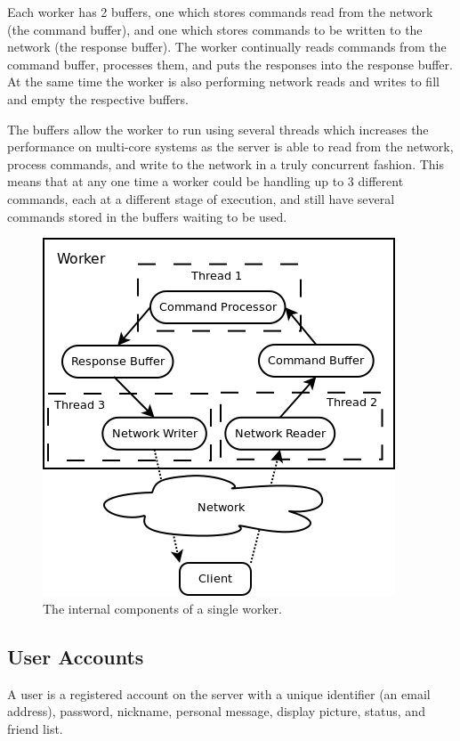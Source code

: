 Each worker has 2 buffers, one which stores commands read from the network (the command buffer), and one which stores commands to be written to the network (the response buffer). The worker continually reads commands from the command buffer, processes them, and puts the responses into the response buffer. At the same time the worker is also performing network reads and writes to fill and empty the respective buffers.

The buffers allow the worker to run using several threads which increases the performance on multi-core systems as the server is able to read from the network, process commands, and write to the network in a truly concurrent fashion. This means that at any one time a worker could be handling up to 3 different commands, each at a different stage of execution, and still have several commands stored in the buffers waiting to be used.

\begin{figure}[!h]
    \begin{center}
        \includegraphics[scale=0.6]{Design/diagrams/worker_detail.png}
        \caption{The internal components of a single worker.}
        \label{WorkerDatailedDia}
    \end{center}
\end{figure}

\subsection{User Accounts}
A user is a registered account on the server with a unique identifier (an email address), password, nickname, personal message, display picture, status, and friend list. 



